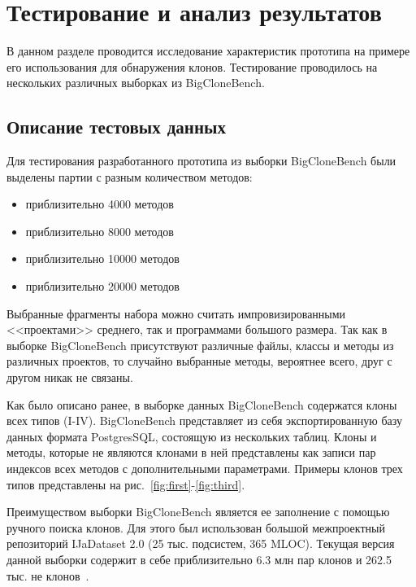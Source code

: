 \chapter{Тестирование и анализ результатов}

В данном разделе проводится исследование характеристик прототипа на примере его использования для обнаружения клонов. Тестирование проводилось на нескольких различных выборках из BigCloneBench.

\section{Описание тестовых данных}

Для тестирования разработанного прототипа из выборки BigCloneBench были выделены партии с разным количеством методов:

\begin{itemize}
\setlength\itemsep{0mm}
\item приблизительно 4000 методов 
\item приблизительно 8000 методов
\item приблизительно 10000 методов
\item приблизительно 20000 методов
\end{itemize}

Выбранные фрагменты набора можно считать импровизированными <<проектами>> среднего, так и программами большого размера. Так как в выборке BigCloneBench присутствуют различные файлы, классы и методы из различных проектов, то случайно выбранные методы, вероятнее всего, друг с другом никак не связаны.

Как было описано ранее, в выборке данных BigCloneBench содержатся клоны всех типов (I-IV). BigCloneBench представляет из себя экспортированную базу данных формата PostgresSQL, состоящую из нескольких таблиц. Клоны и методы, которые не являются клонами в ней представлены как записи пар индексов всех методов с дополнительными параметрами. Примеры клонов трех типов представлены на рис.~\ref{fig:first}-\ref{fig:third}.

Преимуществом выборки BigCloneBench является ее заполнение с помощью ручного поиска клонов. Для этого был использован большой межпроектный репозиторий IJaDataset 2.0 (25 тыс. подсистем, 365 MLOC). Текущая версия данной выборки содержит в себе приблизительно 6.3 млн пар клонов и 262.5 тыс. не клонов~\cite{bcb}.

